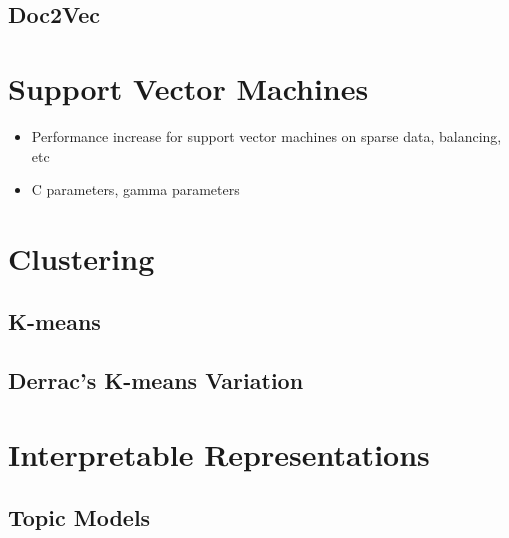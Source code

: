 \subsection{Doc2Vec}




\section{Support Vector Machines}\label{bg:SVM}
\begin{itemize}
	\item Performance increase for support vector machines on sparse data, balancing, etc
	\item C parameters, gamma parameters
\end{itemize}



\section{Clustering}\label{bg:clustering}

\subsection{K-means}

\subsection{Derrac's K-means Variation}

\section{Interpretable Representations}

\subsection{Topic Models}\label{bg:TopicModels}





